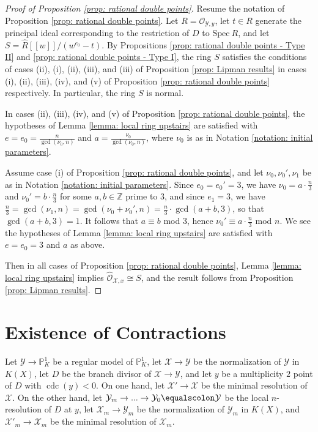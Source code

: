 \documentclass[12pt]{amsart}
\numberwithin{equation}{section}
\theoremstyle{definition}
\newcommand{\Z}{\mathbb Z}
\renewcommand{\O}{\mathcal{O}}
\renewcommand{\P}{\mathbb P}
\newcommand{\Spec}{\mathrm{Spec} \ }
\newcommand{\X}{\mathcal{X}}
\newcommand{\Y}{\mathcal{Y}}
\DeclareMathOperator{\cdc}{cdc}
\begin{document}
\begin{proof}[Proof of Proposition \ref{prop: rational double points}]
   Resume the notation of Proposition \ref{prop: rational double points}. Let $R=\O_{\Y,y}$, let $t\in R$ generate the principal ideal corresponding to the restriction of $D$ to $\Spec R$, and let $S=\widehat{R}[[w]]/(w^{e_0}-t)$. By Propositions \ref{prop: rational double points - Type II} and \ref{prop: rational double points - Type I}, the ring $S$ satisfies the conditions of cases (ii), (i), (ii), (iii), and (iii) of Proposition \ref{prop: Lipman results} in cases (i), (ii), (iii), (iv), and (v) of Proposition \ref{prop: rational double points} respectively. In particular, the ring $S$ is normal.
   
   In cases (ii), (iii), (iv), and (v) of Proposition \ref{prop: rational double points}, the hypotheses of Lemma \ref{lemma: local ring upstairs} are satisfied with $e=e_0=\frac{n}{\gcd(\nu_0,n)}$ and $a=\frac{\nu_0}{\gcd(\nu_0,n)}$, where $\nu_0$ is as in Notation \ref{notation: initial parameters}.
   
   Assume case (i) of Proposition \ref{prop: rational double points}, and let $\nu_0,\nu_0',\nu_1$ be as in Notation \ref{notation: initial parameters}. Since $e_0=e_0'=3$, we have $\nu_0=a\cdot\frac{n}{3}$ and $\nu_0'=b\cdot\frac{n}{3}$ for some $a,b\in\Z$ prime to $3$, and since $e_1=3$, we have $\frac{n}{3}=\gcd(\nu_1,n)=\gcd(\nu_0+\nu_0',n)=\frac{n}{3}\cdot\gcd(a+b,3)$, so that $\gcd(a+b,3)=1$. It follows that $a\equiv b$ mod $3$, hence $\nu_0'\equiv a\cdot\frac{n}{3}$ mod $n$. We see the hypotheses of Lemma \ref{lemma: local ring upstairs} are satisfied with $e=e_0=3$ and $a$ as above.
   
   Then in all cases of Proposition \ref{prop: rational double points}, Lemma \ref{lemma: local ring upstairs} implies $\widehat{\O}_{\X,x}\cong S$, and the result follows from Proposition \ref{prop: Lipman results}. 
\end{proof}

\section{Existence of Contractions}\label{section 6}

Let $\Y\to\P^1_K$ be a regular model of $\P^1_K$, let $\X\to\Y$ be the normalization of $\Y$ in $K(X)$, let $D$ be the branch divisor of $\X\to\Y$, and let $y$ be a multiplicity $2$ point of $D$ with $\cdc(y)<0$. On one hand, let $\X'\to\X$ be the minimal resolution of $\X$. On the other hand, let $\Y_m\to...\to\Y_0\equalscolon \Y$ be the local $n$-resolution of $D$ at $y$, let $\X_m\to\Y_m$ be the normalization of $\Y_m$ in $K(X)$, and $\X'_m\to\X_m$ be the minimal resolution of $\X_m$.
\end{document}
